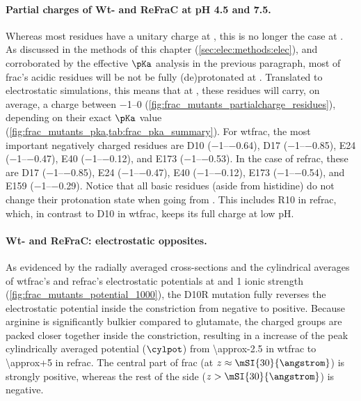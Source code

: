 \paragraph{Partial charges of Wt- and ReFraC at pH 4.5 and 7.5.}
%
Whereas most residues have a unitary charge at , this is no longer the case at . As discussed
in the methods of this chapter (\cref{sec:elec:methods:elec}), and corroborated by the effective $\pKa$
analysis in the previous paragraph, most of \gls{frac}'s acidic residues will be not be fully (de)protonated
at . Translated to electrostatic simulations, this means that at , these residues will carry,
on average, a charge between \SIrange{-1}{0}{\ec} (\cref{fig:frac_mutants_partialcharge_residues}), depending
on their exact $\pKa$ value (\cref{fig:frac_mutants_pka,tab:frac_pka_summary}). For \gls{wtfrac}, the most
important negatively charged residues are D10 (\SIrange{-1}{-0.64}{\ec}), D17 (\SIrange{-1}{-0.85}{\ec}), E24
(\SIrange{-1}{-0.47}{\ec}), E40 (\SIrange{-1}{-0.12}{\ec}), and E173 (\SIrange{-1}{-0.53}{\ec}). In the case
of \gls{refrac}, these are D17 (\SIrange{-1}{-0.85}{\ec}), E24 (\SIrange{-1}{-0.47}{\ec}), E40
(\SIrange{-1}{-0.12}{\ec}), E173 (\SIrange{-1}{-0.54}{\ec}), and E159 (\SIrange{-1}{-0.29}{\ec}). Notice that
all basic residues (aside from histidine) do not change their protonation state when going from
. This includes R10 in \gls{refrac}, which, in contrast to D10 in \gls{wtfrac}, keeps its
full charge at low pH.

\paragraph{Wt- and ReFraC: electrostatic opposites.}
%
As evidenced by the radially averaged cross-sections and the cylindrical averages of \gls{wtfrac}'s and
\gls{refrac}'s electrostatic potentials at  and \SI{1}{\Molar} ionic strength
(\cref{fig:frac_mutants_potential_1000}), the D10R mutation fully reverses the electrostatic potential inside
the constriction from negative to positive. Because arginine is significantly bulkier compared to glutamate,
the charged groups are packed closer together inside the constriction, resulting in a increase of the peak
cylindrically averaged potential ($\cylpot$) from \SI{\approx-2.5}{\kTe} in \gls{wtfrac} to
\SI[retain-explicit-plus]{\approx+5}{\kTe} in \gls{refrac}. The central part of \gls{frac} (at $z \approx
\mSI{30}{\angstrom}$) is strongly positive, whereas the rest of the \cisi{} side ($z > \mSI{30}{\angstrom}$)
is negative.

